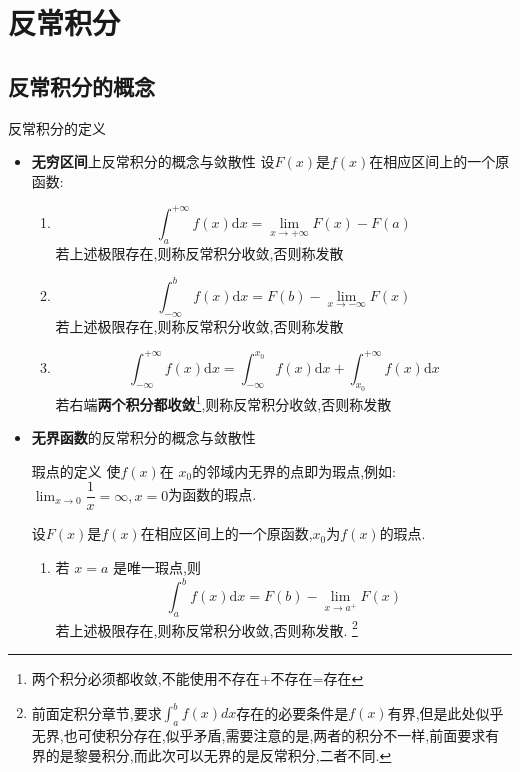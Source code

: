 \documentclass[8pt a4paper, oneside, UTF8]{ctexbook}  %
\begin{document}
\begin{sloppypar}
    \else
    \fi
    \chapter{反常积分}
    \section{反常积分的概念}
    \begin{defn}{反常积分的定义}{}
        \begin{itemize}
            \item \textbf{无穷区间}上反常积分的概念与敛散性
                  \newline
                  设$F(x)$是$f(x)$在相应区间上的一个原函数:
                  \begin{enumerate}
                      \item $$
                                \int_{a}^{+\infty}f(x)\mathrm{d}x=\lim_{x\to+\infty}F(x)-F(a)
                            $$若上述极限存在,则称反常积分收敛,否则称发散
                      \item $$\int_{-\infty}^{b}f(x)\mathrm{d}x=F(b)-\lim_{x\to-\infty}F(x)$$若上述极限存在,则称反常积分收敛,否则称发散
                      \item $$\int_{-\infty}^{+\infty}f(x)\mathrm{d}x=\int_{-\infty}^{x_{0}}f(x)\mathrm{d}x+\int_{x_{0}}^{+\infty}f(x)\mathrm{d}x$$若右端\textbf{两个积分都收敛}\footnote{两个积分必须都收敛,不能使用不存在+不存在=存在},则称反常积分收敛,否则称发散
                  \end{enumerate}
            \item \textbf{无界函数}的反常积分的概念与敛散性
                  \begin{defn}{瑕点的定义}{}
                      使$f(x)$在 $x_0$的邻域内无界的点即为瑕点,例如:$\lim_{x\to 0}\dfrac{1}{x}=\infty ,x=0$为函数的瑕点.
                  \end{defn}
                  设$F(x)$是$f(x)$在相应区间上的一个原函数,$x_0$为$f(x)$的瑕点.
                  \begin{enumerate}
                      \item 若 $x=a$ 是唯一瑕点,则
                            $$\int_a^bf(x)\mathrm{d}x=F(b)-\lim_{x\to a^+}F(x)$$
                            若上述极限存在,则称反常积分收敛,否则称发散. \footnote{前面定积分章节,要求$\int_a ^b f(x) dx$存在的必要条件是$f(x)$有界,但是此处似乎无界,也可使积分存在,似乎矛盾,需要注意的是,两者的积分不一样,前面要求有界的是黎曼积分,而此次可以无界的是反常积分,二者不同.}

\end{enumerate}
\end{itemize}
\end{defn}
\end{sloppypar}
\end{document}
